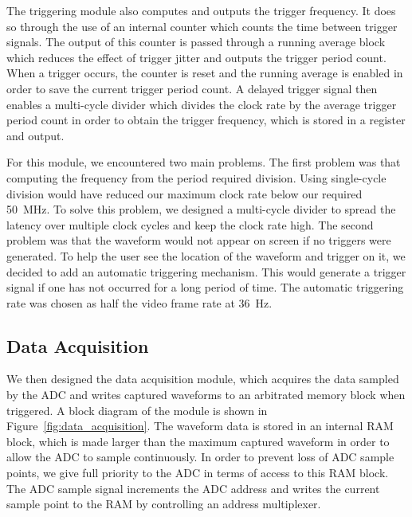 \documentclass[journal,hidelinks]{IEEEtran}
\begin{document}
The triggering module also computes and outputs the trigger frequency. It does so through the use of an internal counter which counts the time between trigger signals. The output of this counter is passed through a running average block which reduces the effect of trigger jitter and outputs the trigger period count. When a trigger occurs, the counter is reset and the running average is enabled in order to save the current trigger period count. A delayed trigger signal then enables a multi-cycle divider which divides the clock rate by the average trigger period count in order to obtain the trigger frequency, which is stored in a register and output.

For this module, we encountered two main problems. The first problem was that computing the frequency from the period required division. Using single-cycle division would have reduced our maximum clock rate below our required 50~MHz. To solve this problem, we designed a multi-cycle divider to spread the latency over multiple clock cycles and keep the clock rate high. The second problem was that the waveform would not appear on screen if no triggers were generated. To help the user see the location of the waveform and trigger on it, we decided to add an automatic triggering mechanism. This would generate a trigger signal if one has not occurred for a long period of time. The automatic triggering rate was chosen as half the video frame rate at 36~Hz.

\subsection{Data Acquisition}

We then designed the data acquisition module, which acquires the data sampled by the ADC and writes captured waveforms to an arbitrated memory block when triggered. A block diagram of the module is shown in Figure~\ref{fig:data_acquisition}. The waveform data is stored in an internal RAM block, which is made larger than the maximum captured waveform in order to allow the ADC to sample continuously. In order to prevent loss of ADC sample points, we give full priority to the ADC in terms of access to this RAM block. The ADC sample signal increments the ADC address and writes the current sample point to the RAM by controlling an address multiplexer.
\end{document}
